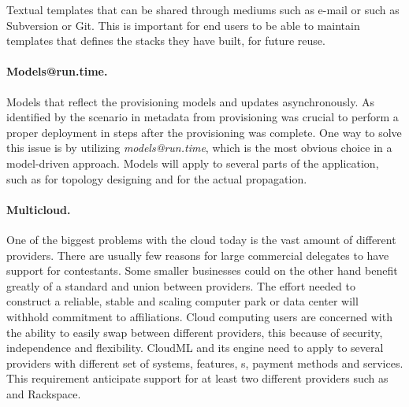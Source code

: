 Textual templates that can be shared through mediums such as e-mail or 
 such as Subversion or Git.
This is important for end users to be able to maintain templates that defines the stacks they have built, for future reuse.

\paragraph{Models@run.time.}

Models that reflect the provisioning models and updates asynchronously. 
As identified by the scenario in  metadata from provisioning was crucial to perform
a proper deployment in steps after the provisioning was complete.
One way to solve this issue is by utilizing \emph{models@run.time}, which is the most obvious choice in a
model-driven approach.
Models will apply to several parts of the application, such as for topology designing and for the actual propagation.

\paragraph{Multicloud.}

One of the biggest problems with the cloud today is the vast amount of different providers. 
There are usually few reasons for large commercial delegates to have support for contestants. 
Some smaller businesses could on the other hand benefit greatly of a standard and union 
between providers.
The effort needed to construct a reliable, stable and scaling computer park or data center will 
withhold commitment to affiliations. 
Cloud computing users are concerned with the ability to easily swap between different providers, 
this because of security, 
independence and flexibility. 
CloudML and its engine need to apply to several providers with different set of systems, 
features, s, payment methods and services. This requirement anticipate support for at least two different providers such as  and Rackspace.
